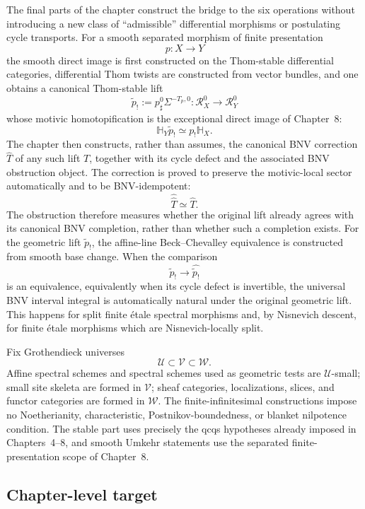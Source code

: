 The final parts of the chapter construct the bridge to the six operations
without introducing a new class of ``admissible'' differential morphisms or
postulating cycle transports.  For a smooth separated morphism of finite
presentation
\[
  p:X\longrightarrow Y
\]
the smooth direct image is first constructed on the Thom-stable differential
categories, differential Thom twists are constructed from vector bundles, and
one obtains a canonical Thom-stable lift
\[
  \widetilde p_!
  :=
  p_\sharp^0\Sigma^{-T_p,0}
  :\mathcal R_X^0\longrightarrow\mathcal R_Y^0
\]
whose motivic homotopification is the exceptional direct image of Chapter~8:
\[
  \mathbb H_Y\widetilde p_!
  \simeq
  p_!\mathbb H_X.
\]
The chapter then constructs, rather than assumes, the canonical BNV correction
\(\widehat T\) of any such lift \(T\), together with its cycle defect and the
associated BNV obstruction object.  The correction is proved to preserve the
motivic-local sector automatically and to be BNV-idempotent:
\[
  \widehat{\widehat T}\simeq\widehat T.
\]
The obstruction therefore measures whether the original lift already agrees
with its canonical BNV completion, rather than whether such a completion
exists.  For the geometric lift \(\widetilde p_!\), the affine-line
Beck--Chevalley equivalence is constructed from smooth base change.  When the
comparison
\[
  \widetilde p_!\longrightarrow\widehat{\widetilde p_!}
\]
is an equivalence, equivalently when its cycle defect is invertible, the
universal BNV interval integral is automatically natural under the original
geometric lift.  This happens for split finite \'etale spectral morphisms and,
by Nisnevich descent, for finite \'etale morphisms which are
Nisnevich-locally split.

\begin{convention}
Fix Grothendieck universes
\[
  \mathcal U\subset\mathcal V\subset\mathcal W.
\]
Affine spectral schemes and spectral schemes used as geometric tests are
\(\mathcal U\)-small; small site skeleta are formed in \(\mathcal V\); sheaf
categories, localizations, slices, and functor categories are formed in
\(\mathcal W\).  The finite-infinitesimal constructions impose no
Noetherianity, characteristic, Postnikov-boundedness, or blanket nilpotence
condition.  The stable part uses precisely the qcqs hypotheses already imposed
in Chapters~4--8, and smooth Umkehr statements use the separated
finite-presentation scope of Chapter~8.
\end{convention}

\subsection{Chapter-level target}


